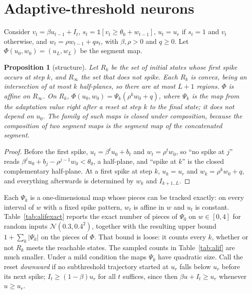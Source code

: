 \documentclass[10pt]{article}
\newtheorem{proposition}[theorem]{Proposition}
\theoremstyle{remark}
\begin{document}
\section{Adaptive-threshold neurons}
\label{app:alif}

Consider $v_t=\beta u_{t-1}+I_t$, $s_t=\mathbb 1[v_t\ge\theta_0+w_{t-1}]$, $u_t=u_r$ if $s_t=1$ and $v_t$ otherwise, and $w_t=\rho w_{t-1}+qs_t$, with $\beta,\rho>0$ and $q\ge0$. Let $\Phi(u_0,w_0)=(u_L,w_L)$ be the segment map.

\begin{proposition}[structure]
\label{prop:alif}
Let $R_k$ be the set of initial states whose first spike occurs at step $k$, and $R_\infty$ the set that does not spike. Each $R_k$ is convex, being an intersection of at most $k$ half-planes, so there are at most $L+1$ regions. $\Phi$ is affine on $R_\infty$. On $R_k$, $\Phi(u_0,w_0)=\Psi_k(\rho^kw_0+q)$, where $\Psi_k$ is the map from the adaptation value right after a reset at step $k$ to the final state; it does not depend on $u_0$. The family of such maps is closed under composition, because the composition of two segment maps is the segment map of the concatenated segment.
\end{proposition}
\begin{proof}
Before the first spike, $u_t=\beta^tu_0+b_t$ and $w_t=\rho^tw_0$, so ``no spike at $j$'' reads $\beta^ju_0+b_j-\rho^{j-1}w_0<\theta_0$, a half-plane, and ``spike at $k$'' is the closed complementary half-plane. At a first spike at step $k$, $u_k=u_r$ and $w_k=\rho^kw_0+q$, and everything afterwards is determined by $w_k$ and $I_{k+1..L}$.
\end{proof}

Each $\Psi_k$ is a one-dimensional map whose pieces can be tracked exactly: on every interval of $w$ with a fixed spike pattern, $w_t$ is affine in $w$ and $u_t$ is constant. Table~\ref{tab:alifexact} reports the exact number of pieces of $\Psi_0$ on $w\in[0,4]$ for random inputs $\mathcal N(0.3,0.4^2)$, together with the resulting upper bound $1+\sum_k|\Psi_k|$ on the pieces of $\Phi$. That bound is loose: it counts every $k$, whether or not $R_k$ meets the reachable states. The sampled counts in Table~\ref{tab:alif} are much smaller. Under a mild condition the maps $\Psi_k$ have quadratic size. Call the reset \emph{downward} if no subthreshold trajectory started at $u_r$ falls below $u_r$ before its next spike; $I_t\ge(1-\beta)u_r$ for all $t$ suffices, since then $\beta u+I_t\ge u_r$ whenever $u\ge u_r$.
\end{document}
